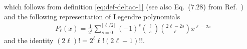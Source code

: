 \documentclass[aps,prd,preprint,nofootinbib,amsmath,amssymb,showpacs,longbibliography,singlecolumn,superscriptaddress,10pt]{revtex4-1}
\theoremstyle{plain}
\theoremstyle{definition}
\begin{document}
%
which follows from definition \eqref{eq:def-deltao-1} (see also 
Eq.~(7.28) from Ref.~\cite{Denicol:2021}) and the following representation of Legendre polynomials
%
\begin{equation}
\begin{aligned}
&
P_{\ell}(x) = \frac{1}{2^{\ell}}\sum_{s=0}^{\lceil \ell / 2 \rceil} 
(-1)^{s} \binom{\ell}{s}
\binom{2\ell-2s}{\ell} x^{\ell - 2s}
\end{aligned}    
\end{equation}
%
and the identity $(2 \ell)! = 2^{\ell} \ell! (2 \ell - 1)!!$.



\end{document}
